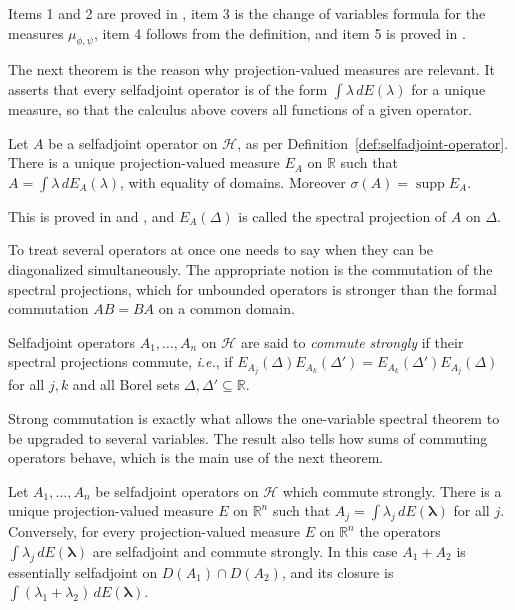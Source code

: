 \noindent Items 1 and 2 are proved in \cite[TODO-location]{TODO-RS03}, item 3 is the change of variables formula for the measures $\mu_{\phi,\psi}$, item 4 follows from the definition, and item 5 is proved in \cite[TODO-location]{TODO-Mor18}.

The next theorem is the reason why projection-valued measures are relevant. It asserts that every selfadjoint operator is of the form $\int\lambda\,dE(\lambda)$ for a unique measure, so that the calculus above covers all functions of a given operator.

\begin{theorem}\label{thm:spectral}
	Let $A$ be a selfadjoint operator on $\mathcal{H}$, as per Definition~\ref{def:selfadjoint-operator}. There is a unique projection-valued measure $E_A$ on $\mathbb{R}$ such that $A=\int\lambda\,dE_A(\lambda)$, with equality of domains. Moreover $\sigma(A)=\operatorname{supp}E_A$.
\end{theorem}

\noindent This is proved in \cite[TODO-location]{TODO-RS03} and \cite[TODO-location]{TODO-Mor18}, and $E_A(\Delta)$ is called the spectral projection of $A$ on $\Delta$.

To treat several operators at once one needs to say when they can be diagonalized simultaneously. The appropriate notion is the commutation of the spectral projections, which for unbounded operators is stronger than the formal commutation $AB=BA$ on a common domain.

\begin{definition}\label{def:strongly-commuting}
	Selfadjoint operators $A_1,\dots,A_n$ on $\mathcal{H}$ are said to \emph{commute strongly} if their spectral projections commute, \textit{i.e.}, if $E_{A_j}(\Delta)E_{A_k}(\Delta')=E_{A_k}(\Delta')E_{A_j}(\Delta)$ for all $j,k$ and all Borel sets $\Delta,\Delta'\subseteq\mathbb{R}$.
\end{definition}

Strong commutation is exactly what allows the one-variable spectral theorem to be upgraded to several variables. The result also tells how sums of commuting operators behave, which is the main use of the next theorem.

\begin{theorem}\label{thm:joint-spectral}
	Let $A_1,\dots,A_n$ be selfadjoint operators on $\mathcal{H}$ which commute strongly. There is a unique projection-valued measure $E$ on $\mathbb{R}^n$ such that $A_j=\int\lambda_j\,dE(\boldsymbol{\lambda})$ for all $j$. Conversely, for every projection-valued measure $E$ on $\mathbb{R}^n$ the operators $\int\lambda_j\,dE(\boldsymbol{\lambda})$ are selfadjoint and commute strongly. In this case $A_1+A_2$ is essentially selfadjoint on $D(A_1)\cap D(A_2)$, and its closure is $\int(\lambda_1+\lambda_2)\,dE(\boldsymbol{\lambda})$.
\end{theorem}


